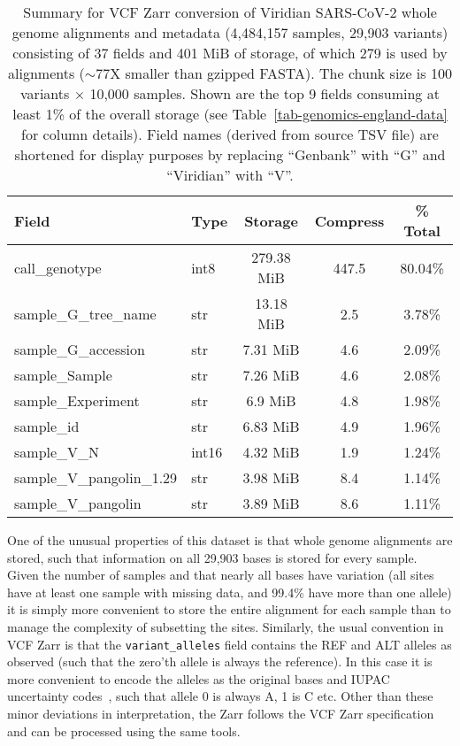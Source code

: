 \documentclass[a4paper,num-refs]{oup-contemporary}
\begin{document}
\begin{table}
\caption{Summary for VCF Zarr conversion of Viridian SARS-CoV-2
whole genome alignments and metadata 
(4,484,157 samples, 29,903 variants)
consisting of 37 fields and 401 MiB of storage, 
of which 279 is used by alignments ($\sim 77$X smaller 
than gzipped FASTA). The chunk size is 100 variants $\times$
10,000 samples.
Shown are the top 9 fields consuming at least 1\% of the 
overall storage (see Table~\ref{tab-genomics-england-data} for column details).
Field names (derived from source TSV file) are shortened for 
display purposes by replacing ``Genbank'' with ``G''
and ``Viridian'' with ``V''.
\label{tab-sc2-data}}
\begin{tabular}{llS[table-format=3.2]S[table-format=3.2]S[table-format=3.2]}
\toprule
{Field} & {Type} & {Storage} & {Compress} & {\% Total} \\
\midrule
call\_genotype & int8 & 279.38 MiB & 447.5 & 80.04\% \\
sample\_G\_tree\_name & str & 13.18 MiB & 2.5 & 3.78\% \\
sample\_G\_accession & str & 7.31 MiB & 4.6 & 2.09\% \\
sample\_Sample & str & 7.26 MiB & 4.6 & 2.08\% \\
sample\_Experiment & str & 6.9 MiB & 4.8 & 1.98\% \\
sample\_id & str & 6.83 MiB & 4.9 & 1.96\% \\
sample\_V\_N & int16 & 4.32 MiB & 1.9 & 1.24\% \\
sample\_V\_pangolin\_1.29 & str & 3.98 MiB & 8.4 & 1.14\% \\
sample\_V\_pangolin & str & 3.89 MiB & 8.6 & 1.11\% \\
\bottomrule
\end{tabular}
\end{table}

One of the unusual properties of this dataset is that whole genome alignments
are stored, such that information on all 29,903 bases is stored for every
sample. Given the number of samples and that nearly all bases have 
variation (all sites have at least one sample with missing data,
and 99.4\% have more than one allele)
it is simply more convenient to
store the entire alignment for each sample than to manage the complexity
of subsetting the sites. Similarly, the usual convention in VCF Zarr
is that the \texttt{variant\_alleles} field contains the REF and ALT
alleles as observed (such that the zero'th allele is always the reference).
In this case it is more convenient to encode the alleles as the original
bases and IUPAC uncertainty codes~\citep{cornish1985nomenclature}, 
such that allele 0 is always A, 1 is C etc.
Other than these minor deviations in interpretation, the Zarr follows
the VCF Zarr specification and can be processed using the same tools.
\end{document}

